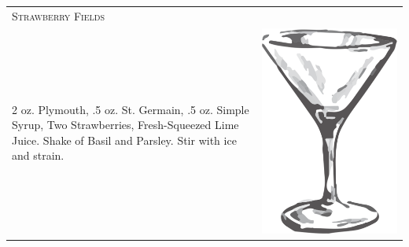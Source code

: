 \documentclass{article}
\begin{document}
\begin{multicols}{2}
\begin{tabular}{p{2in} p{0.5in}}
\multicolumn{2}{p{3in}}{\centering\Huge\textsc{Strawberry Fields}} \\ 
   \vspace{-0.1in}2 oz. Plymouth, .5 oz. St. Germain, .5 oz. Simple Syrup, Two Strawberries, Fresh-Squeezed Lime Juice. Shake of Basil and Parsley. Stir with ice and strain. &
   \vspace{-0.1in} \includegraphics{goblet.png}
\end{tabular}


\end{multicols}
\end{document}
